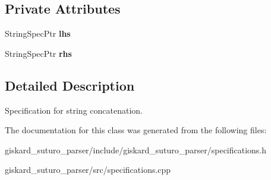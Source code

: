 \subsection*{Private Attributes}
\begin{DoxyCompactItemize}
\item 
\hypertarget{classgiskard__suturo_1_1ConcatStringSpec_a2e8afe14e8bbbd562261dbbffba9e5c8}{String\-Spec\-Ptr {\bfseries lhs}}\label{classgiskard__suturo_1_1ConcatStringSpec_a2e8afe14e8bbbd562261dbbffba9e5c8}

\item 
\hypertarget{classgiskard__suturo_1_1ConcatStringSpec_a0db70a10361063e80851b0fbab9692f9}{String\-Spec\-Ptr {\bfseries rhs}}\label{classgiskard__suturo_1_1ConcatStringSpec_a0db70a10361063e80851b0fbab9692f9}

\end{DoxyCompactItemize}


\subsection{Detailed Description}
Specification for string concatenation. 

The documentation for this class was generated from the following files\-:\begin{DoxyCompactItemize}
\item 
giskard\-\_\-suturo\-\_\-parser/include/giskard\-\_\-suturo\-\_\-parser/specifications.\-h\item 
giskard\-\_\-suturo\-\_\-parser/src/specifications.\-cpp\end{DoxyCompactItemize}
